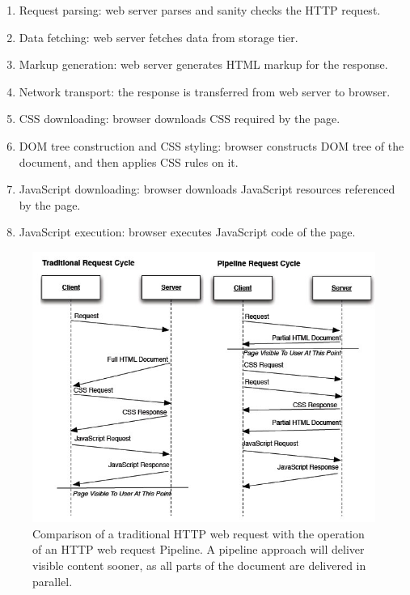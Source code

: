 \documentclass[12pt]{report}
\begin{document}
\begin{enumerate}
  \item Request parsing: web server parses and sanity checks the HTTP request. 
  \item Data fetching: web server fetches data from storage tier.
  \item Markup generation: web server generates HTML markup for the response. 
  \item Network transport: the response is transferred from web server to browser.
  \item CSS downloading: browser downloads CSS required by the page. 
  \item DOM tree construction and CSS styling: browser constructs DOM tree of the document, and then applies CSS rules on it.
  \item JavaScript downloading: browser downloads JavaScript resources referenced by the page.
  \item JavaScript execution: browser executes JavaScript code of the page.
\end{enumerate}

\begin{figure}[H]
\caption{Comparison of a traditional HTTP web request with the operation of an HTTP web request Pipeline. A pipeline approach will deliver visible content sooner, as all parts of the document are delivered in parallel.}
\label{fig:httpRequestCycles}
\centering
\includegraphics[width=145mm]{figures/images/http_request_cycles.jpg}
\end{figure}
\end{document}
